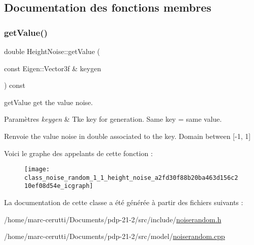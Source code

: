 \subsection{Documentation des fonctions membres}
\mbox{\label{class_noise_random_1_1_height_noise_a2fd30f88b20ba463d156c210ef08d54e}} 
\subsubsection{\texorpdfstring{get\+Value()}{getValue()}}
{\footnotesize\ttfamily double Height\+Noise\+::get\+Value (\begin{DoxyParamCaption}\item[{const Eigen\+::\+Vector3f \&}]{keygen }\end{DoxyParamCaption}) const}



get\+Value get the value noise. 


\begin{DoxyParams}{Paramètres}
{\em keygen} & Tke key for generation. Same key = same value. \\
\hline
\end{DoxyParams}
\begin{DoxyReturn}{Renvoie}
the value noise in double associated to the key. Domain between \mbox{[}-\/1, 1\mbox{]} 
\end{DoxyReturn}
Voici le graphe des appelants de cette fonction \+:\nopagebreak
\begin{figure}[H]
\begin{center}
\leavevmode
\texttt{[image: class\_noise\_random\_1\_1\_height\_noise\_a2fd30f88b20ba463d156c210ef08d54e\_icgraph]}
\end{center}
\end{figure}


La documentation de cette classe a été générée à partir des fichiers suivants \+:\begin{DoxyCompactItemize}
\item 
/home/marc-\/cerutti/\+Documents/pdp-\/21-\/2/src/include/\hyperlink{noiserandom_8h}{noiserandom.\+h}\item 
/home/marc-\/cerutti/\+Documents/pdp-\/21-\/2/src/model/\hyperlink{noiserandom_8cpp}{noiserandom.\+cpp}\end{DoxyCompactItemize}
